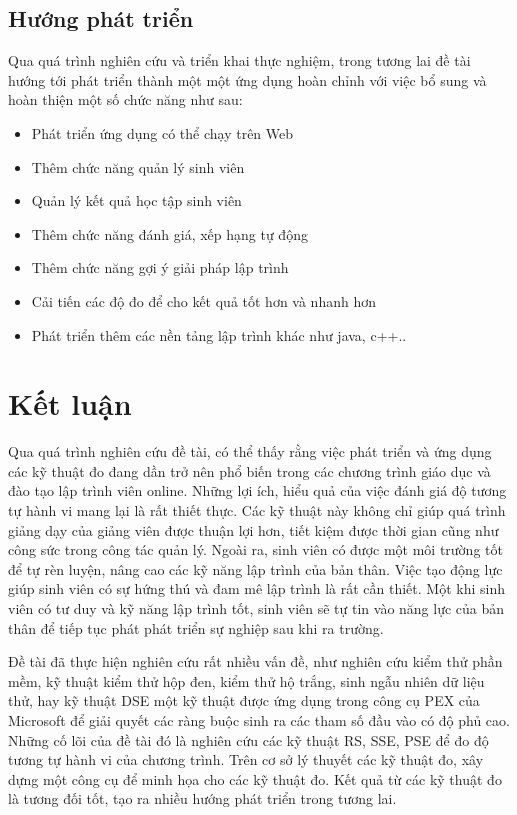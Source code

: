 \subsection{Hướng phát triển}
Qua quá trình nghiên cứu và triển khai thực nghiệm, trong tương lai đề tài hướng tới phát triển thành một một ứng dụng hoàn chỉnh với việc bổ sung và hoàn thiện một số chức năng như sau:
\begin{itemize}
	\item Phát triển ứng dụng có thể chạy trên Web
	\item Thêm chức năng quản lý sinh viên
	\item Quản lý kết quả học tập sinh viên
	\item Thêm chức năng đánh giá, xếp hạng tự động
	\item Thêm chức năng gợi ý giải pháp lập trình
	\item Cải tiến các độ đo để cho kết quả tốt hơn và nhanh hơn
	\item Phát triển thêm các nền tảng lập trình khác như java, c++..		
\end{itemize}

\section{Kết luận}
Qua quá trình nghiên cứu đề tài, có thể thấy rằng việc phát triển và ứng dụng các kỹ thuật đo đang dần trở nên phổ biến trong các chương trình giáo dục và đào tạo lập trình viên online. Những lợi ích, hiểu quả của việc đánh giá độ tương tự hành vi mang lại là rất thiết thực. Các kỹ thuật này không chỉ giúp quá trình giảng dạy của giảng viên được thuận lợi hơn, tiết kiệm được thời gian cũng như công sức trong công tác quản lý. Ngoài ra, sinh viên có được một môi trường tốt để tự rèn luyện, nâng cao các kỹ năng lập trình của bản thân. Việc tạo động lực giúp sinh viên có sự hứng thú và đam mê lập trình là rất cần thiết. Một khi sinh viên có tư duy và kỹ năng lập trình tốt, sinh viên sẽ tự tin vào năng lực của bản thân để tiếp tục phát phát triển sự nghiệp sau khi ra trường.

Đề tài đã thực hiện nghiên cứu rất nhiều vấn đề, như nghiên cứu kiểm thử phần mềm, kỹ thuật kiểm thử hộp đen, kiểm thử hộ trắng, sinh ngẫu nhiên dữ liệu thử, hay kỹ thuật DSE một kỹ thuật được ứng dụng trong công cụ PEX của Microsoft để giải quyết các ràng buộc sinh ra các tham số đầu vào có độ phủ cao. Những cố lõi của đề tài đó là nghiên cứu các kỹ thuật RS, SSE, PSE để đo độ tương tự hành vi của chương trình. Trên cơ sở lý thuyết các kỹ thuật đo, xây dựng một công cụ để minh họa cho các kỹ thuật đo. Kết quả từ các kỹ thuật đo là tương đối tốt, tạo ra nhiều hướng phát triển trong tương lai.

